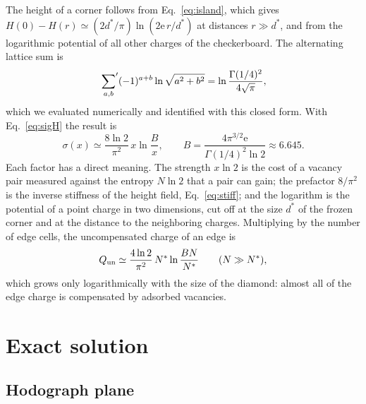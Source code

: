 \documentclass[reprint,aps,pre,superscriptaddress,longbibliography,floatfix,amsmath,amssymb]{revtex4-2}
\newcommand{\Nst}{N^{*}}                 %
\newcommand{\sig}{\sigma}                %
\newcommand{\dst}{d^{*}}                 %
\newcommand{\Qun}{Q_{\rm un}}
\newcommand{\ee}{\mathrm{e}}
\begin{document}
The height of a corner follows from Eq.~\eqref{eq:island}, which gives $H(0)-H(r)\simeq(2\dst/\pi)\ln(2\ee\,r/\dst)$ at distances $r\gg\dst$, and from the logarithmic potential of all other charges of the checkerboard. The alternating lattice sum is
\begin{equation}
  \sideset{}{'}\sum_{a,b}(-1)^{a+b}\ln\sqrt{a^2+b^2}=\ln\frac{\Gamma(1/4)^2}{4\sqrt\pi},
\end{equation}
which we evaluated numerically and identified with this closed form. With Eq.~\eqref{eq:sigH} the result is
\begin{equation}\label{eq:smallx}
  \sig(x)\simeq\frac{8\ln2}{\pi^2}\,x\ln\frac{B}{x},\qquad B=\frac{4\pi^{3/2}\ee}{\Gamma(1/4)^2\ln2}\approx6.645 .
\end{equation}
Each factor has a direct meaning. The strength $x\ln2$ is the cost of a vacancy pair measured against the entropy $N\ln2$ that a pair can gain; the prefactor $8/\pi^2$ is the inverse stiffness of the height field, Eq.~\eqref{eq:stiff}; and the logarithm is the potential of a point charge in two dimensions, cut off at the size $\dst$ of the frozen corner and at the distance to the neighboring charges. Multiplying by the number of edge cells, the uncompensated charge of an edge is
\begin{equation}\label{eq:Qun}
  \Qun\simeq\frac{4\ln2}{\pi^2}\,\Nst\ln\frac{BN}{\Nst}\qquad(N\gg\Nst),
\end{equation}
which grows only logarithmically with the size of the diamond: almost all of the edge charge is compensated by adsorbed vacancies.

\section{Exact solution}\label{sec:exact}

\subsection{Hodograph plane}
\end{document}
